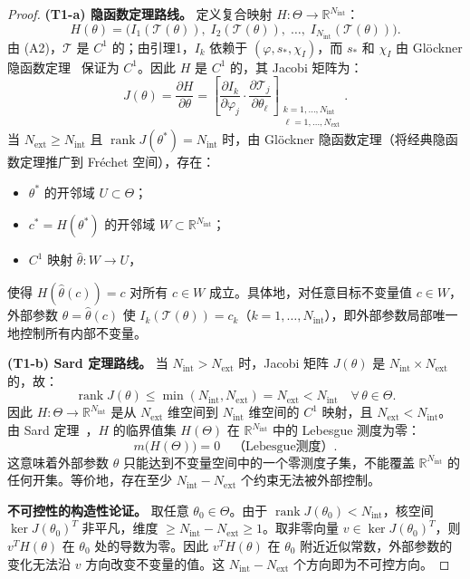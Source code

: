 \documentclass[12pt,a4paper]{article}
\theoremstyle{definition}
\newcommand{\mT}{\mathcal{T}}
\newcommand{\mTheta}{\Theta}
\newcommand{\R}{\mathbb{R}}
\newcommand{\chiI}{\chi_I}
\newcommand{\Nint}{N_{\mathrm{int}}}
\newcommand{\Next}{N_{\mathrm{ext}}}
\newcommand{\rank}{\operatorname{rank}}
\begin{document}
\begin{proof}
\textbf{(T1-a) 隐函数定理路线。}
定义复合映射 $H: \mTheta \to \R^{\Nint}$：
\begin{equation}
H(\theta) = \bigl(I_1(\mT(\theta)),\; I_2(\mT(\theta)),\; \ldots,\; I_{\Nint}(\mT(\theta))\bigr).
\end{equation}
由 (A2)，$\mT$ 是 $C^1$ 的；由引理1，$I_k$ 依赖于 $(\varphi, s_*, \chiI)$，而 $s_*$ 和 $\chiI$ 由 Glöckner 隐函数定理~\cite{Glockner2006} 保证为 $C^1$。因此 $H$ 是 $C^1$ 的，其 Jacobi 矩阵为：
\begin{equation}
J(\theta) = \frac{\partial H}{\partial \theta} = \left[\frac{\partial I_k}{\partial \varphi_j} \cdot \frac{\partial \mT_j}{\partial \theta_\ell}\right]_{\substack{k=1,\ldots,\Nint \\ \ell=1,\ldots,\Next}}.
\end{equation}
当 $\Next \geq \Nint$ 且 $\rank J(\theta^*) = \Nint$ 时，由 Glöckner 隐函数定理（将经典隐函数定理推广到 Fréchet 空间），存在：
\begin{itemize}[leftmargin=*]
\item $\theta^*$ 的开邻域 $U \subset \mTheta$；
\item $c^* = H(\theta^*)$ 的开邻域 $W \subset \R^{\Nint}$；
\item $C^1$ 映射 $\hat{\theta}: W \to U$，
\end{itemize}
使得 $H(\hat{\theta}(c)) = c$ 对所有 $c \in W$ 成立。具体地，对任意目标不变量值 $c \in W$，外部参数 $\theta = \hat{\theta}(c)$ 使 $I_k(\mT(\theta)) = c_k$（$k = 1, \ldots, \Nint$），即外部参数局部唯一地控制所有内部不变量。

\textbf{(T1-b) Sard 定理路线。}
当 $\Nint > \Next$ 时，Jacobi 矩阵 $J(\theta)$ 是 $\Nint \times \Next$ 的，故：
\begin{equation}
\rank J(\theta) \leq \min(\Nint, \Next) = \Next < \Nint \quad \forall\, \theta \in \mTheta.
\end{equation}
因此 $H: \mTheta \to \R^{\Nint}$ 是从 $\Next$ 维空间到 $\Nint$ 维空间的 $C^1$ 映射，且 $\Next < \Nint$。由 Sard 定理~\cite{Olver1993}，$H$ 的临界值集 $H(\mTheta)$ 在 $\R^{\Nint}$ 中的 Lebesgue 测度为零：
\begin{equation}
m\bigl(H(\mTheta)\bigr) = 0 \quad \text{（Lebesgue测度）}.
\end{equation}
这意味着外部参数 $\theta$ 只能达到不变量空间中的一个零测度子集，不能覆盖 $\R^{\Nint}$ 的任何开集。等价地，存在至少 $\Nint - \Next$ 个约束无法被外部控制。

\textbf{不可控性的构造性论证。} 取任意 $\theta_0 \in \mTheta$。由于 $\rank J(\theta_0) < \Nint$，核空间 $\ker J(\theta_0)^T$ 非平凡，维度 $\geq \Nint - \Next \geq 1$。取非零向量 $v \in \ker J(\theta_0)^T$，则 $v^T H(\theta)$ 在 $\theta_0$ 处的导数为零。因此 $v^T H(\theta)$ 在 $\theta_0$ 附近近似常数，外部参数的变化无法沿 $v$ 方向改变不变量的值。这 $\Nint - \Next$ 个方向即为不可控方向。
\end{proof}
\end{document}
